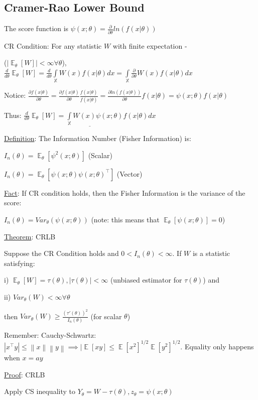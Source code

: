 \documentclass{article}
\DeclareMathOperator{\EX}{\mathbb{E}} %
\let\Oldint=\int
\renewcommand{\int}{\Oldint\limits}
\newcommand{\norm}[1]{\left\lVert#1\right\rVert}
\begin{document}
\subsection{Cramer-Rao Lower Bound}

The score function is $\psi(x;\theta) = \frac{\partial}{\partial \theta}ln(f(x|\theta))$

CR Condition: For any statistic $W$ with finite expectation - 

($|\EX_{\theta}[W]| < \infty \forall \theta$), $\frac{d}{d\theta}\EX_{\theta}[W] = \frac{d}{d\theta} \int_{\mathbb{X}}W(x)f(x|\theta)dx = \int_{\mathbb{X}}\frac{\partial}{\partial\theta}W(x)f(x|\theta)dx$

Notice: $\frac{\partial f(x|\theta)}{\partial \theta} = \frac{\partial f(x|\theta)}{\partial \theta}\frac{f(x|\theta)}{f(x|\theta)} = \frac{\partial ln(f(x|\theta))}{\partial \theta}f(x|\theta) = \psi(x;\theta)f(x|\theta)$

Thus: $\underline{\frac{d}{d \theta} \EX_{\theta}[W] = \int_{\mathbb{X}} W(x)\psi(x;\theta)f(x|\theta)dx}$


\underline{Definition}: The Information Number (Fisher Information) is: 

$I_n(\theta) = \EX_{\theta}[\psi^2(x;\theta)]$ (Scalar)

$I_n(\theta) = \EX_{\theta}[\psi(x;\theta)\psi(x;\theta)^{\top}]$ (Vector)

\underline{Fact}: If CR condition holds, then the Fisher Information is the variance of the score: 

$I_n(\theta) = Var_{\theta}(\psi(x;\theta))$ (note: this means that $\EX_{\theta}[\psi(x;\theta)] = 0$)

\underline{Theorem}: CRLB

Suppose the CR Condition holds and $0 < I_n(\theta) < \infty$. If $W$ is a statistic satisfying:

i) $\EX_{\theta}[W] = \tau(\theta), |\tau(\theta)| < \infty$ (unbiased estimator for $\tau(\theta)$) and 

ii) $Var_{\theta}(W) < \infty \forall \theta$

then $Var_{\theta}(W) \ge \frac{(\tau'(\theta))^2}{I_n(\theta)}$ (for scalar $\theta$)


Remember: Cauchy-Schwartz: $|x^{\top}y| \le \norm{x}\norm{y} \implies |\EX[xy] \le \EX[x^2]^{1/2}\EX[y^2]^{1/2}$. Equality only happens when $x = ay$


\underline{Proof}: CRLB

Apply CS inequality to $Y_{\theta} = W - \tau(\theta), z_{\theta} = \psi(x;\theta)$
\end{document}
